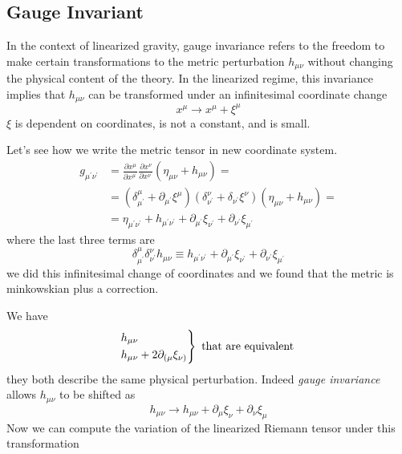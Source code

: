 \subsection{Gauge Invariant}
In the context of linearized gravity, gauge invariance refers to the freedom to make certain transformations to the metric perturbation $h_{\mu \nu }$ without changing the physical content of the theory. In the linearized regime, this invariance implies that $h_{\mu \nu }$ can be transformed under an infinitesimal coordinate change
\[
x^{\mu } \to x^{\mu }+ \xi^{\mu }  
\]
$\xi $ is dependent on coordinates, is not a constant, and is small.\par
Let's see how we write the metric tensor in new coordinate system.
\begin{align}
	g_{\mu ^{\prime }\nu ^{\prime }} &= \frac{\partial x^{\mu }}{\partial x^{\mu ^{\prime }}} \frac{\partial x^{\nu }}{\partial x^{\nu ^{\prime }}} \left( \eta _{\mu \nu } +h_{\mu \nu } \right) = \nonumber\\
	 &= \left( \delta ^{\mu }_{\mu ^{\prime }} + \partial_{\mu ^{\prime }}\xi ^{\mu } \right) \left( \delta^{\nu }_{\nu ^{\prime }} + \delta_{\nu ^{\prime }} \xi ^{\nu } \right) \left( \eta _{\mu \nu }+h_{\mu \nu } \right) = \nonumber\\
	&= \eta _{\mu ^{\prime }\nu ^{\prime }} + h_{\mu ^{\prime }\nu ^{\prime }} +\partial_{\mu ^{\prime }}\xi _{\nu ^{\prime }}+\partial_{\nu ^{\prime }}\xi _{\mu ^{\prime }}
\end{align}
where the last three terms are
\begin{equation}
\delta ^{\mu }_{\mu ^{\prime }}\delta ^{\nu }_{\nu ^{\prime }}h_{\mu \nu } \equiv   h_{\mu ^{\prime }\nu ^{\prime }} +\partial_{\mu ^{\prime }}\xi _{\nu ^{\prime }}+\partial_{\nu ^{\prime }}\xi _{\mu ^{\prime }}
\end{equation}
we did this infinitesimal change of coordinates and we found that the metric is minkowskian plus a correction.\par
We have
\[
\begin{rcases*}
h_{\mu \nu }\\
h_{\mu \nu }+ 2\partial_{(\mu  }\xi _{\nu )}
\end{rcases*}
\text{ that are equivalent }
\]
they both describe the same physical perturbation. Indeed \emph{gauge invariance} allows $h_{\mu \nu } $ to be shifted as
\[
h_{\mu \nu }\to h_{\mu \nu }+\partial_{\mu }\xi _{\nu }+\partial_{\nu }\xi _{\mu }
\]
Now we can compute the variation of the linearized Riemann tensor under this transformation
